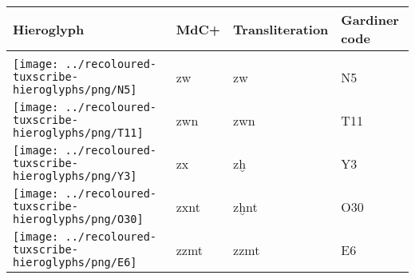 \begin{center}
	\begin{tabularx}{\linewidth}{YYYY}
		Hieroglyph & MdC+ & Transliteration & Gardiner code\\
		\hline\\
		\texttt{[image: ../recoloured-tuxscribe-hieroglyphs/png/N5]} & zw & zw & N5 \\ 
		\texttt{[image: ../recoloured-tuxscribe-hieroglyphs/png/T11]} & zwn & zwn & T11 \\ 
		\texttt{[image: ../recoloured-tuxscribe-hieroglyphs/png/Y3]} & zx & zḫ & Y3 \\ 
		\texttt{[image: ../recoloured-tuxscribe-hieroglyphs/png/O30]} & zxnt & zḫnt & O30 \\ 
		\texttt{[image: ../recoloured-tuxscribe-hieroglyphs/png/E6]} & zzmt & zzmt & E6 \\ 
	\end{tabularx}
\end{center}
